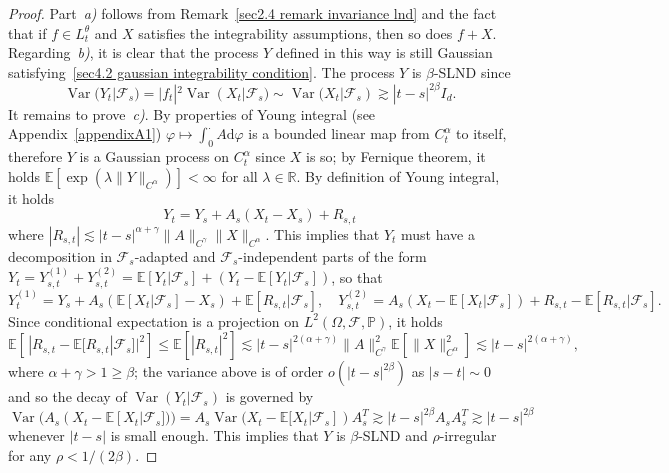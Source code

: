 \documentclass[10pt]{article}
\newcommand{\mathd}{\mathrm{d}}
\newcommand{\nobracket}{}
\newcommand{\tmop}[1]{\ensuremath{\operatorname{#1}}}
\newcommand{\tmtextit}[1]{{\itshape{#1}}}
\begin{document}
\begin{proof}
  Part~\tmtextit{a)} follows from Remark~\ref{sec2.4 remark invariance lnd}
  and the fact that if $f \in L^{\theta}_t$ and $X$ satisfies the
  integrability assumptions, then so does $f + X$. Regarding~\tmtextit{b)}, it
  is clear that the process $Y$ defined in this way is still Gaussian
  satisfying~\eqref{sec4.2 gaussian integrability condition}. The process $Y$
  is $\beta$-SLND since
  \[ \tmop{Var} (Y_t | \mathcal{F}_s \nobracket) = | f_t |^2 \tmop{Var} (X_t |
     \mathcal{F}_s \nobracket) \sim \tmop{Var} (X_t | \mathcal{F}_s
     \nobracket) \gtrsim | t - s |^{2 \beta} I_d . \]
  It remains to prove~\tmtextit{c)}. By properties of Young integral (see
  Appendix~\ref{appendixA1}) $\varphi \mapsto \int_0^{\cdot} A \mathd \varphi$
  is a bounded linear map from $C^{\alpha}_t$ to itself, therefore $Y$ is a
  Gaussian process on $C^{\alpha}_t$ since $X$ is so; by Fernique theorem, it
  holds $\mathbb{E} [\exp (\lambda \| Y \|_{C^{\alpha}})] < \infty$ for all
  $\lambda \in \mathbb{R}$. By definition of Young integral, it holds
  \[ Y_t = Y_s + A_s (X_t - X_s) + R_{s, t} \]
  where $| R_{s, t} | \lesssim | t - s |^{\alpha + \gamma} \| A
  \|_{C^{\gamma}} \| X \|_{C^{\alpha}}$. This implies that $Y_t$ must have a
  decomposition in $\mathcal{F}_s$\mbox{-}adapted and
  $\mathcal{F}_s$\mbox{-}independent parts of the form $Y_t = Y_{s, t}^{(1)} +
  Y_{s, t}^{(2)} =\mathbb{E} [Y_t | \mathcal{F}_s] + (Y_t -\mathbb{E} [Y_t |
  \mathcal{F}_s])$, so that
  \[ Y^{(1)}_t = Y_s + A_s (\mathbb{E} [X_t | \mathcal{F}_s] - X_s)
     +\mathbb{E} [R_{s, t} | \mathcal{F}_s], \quad Y^{(2)}_{s, t} = A_s (X_t
     -\mathbb{E} [X_t | \mathcal{F}_s]) + R_{s, t} -\mathbb{E} [R_{s, t} |
     \mathcal{F}_s] . \]
  Since conditional expectation is a projection on $L^2 (\Omega, \mathcal{F},
  \mathbb{P})$, it holds
  \[ \mathbb{E} \left[ \, | R_{s, t} -\mathbb{E} [R_{s, t} | \mathcal{F}_s]
     |^2 \right] \leqslant \mathbb{E} [| R_{s, t} |^2] \lesssim | t - s |^{2
     (\alpha + \gamma)}  \| A \|_{C^{\gamma}}^2 \mathbb{E} [\| X
     \|^2_{C^{\alpha}}] \lesssim | t - s |^{2 (\alpha + \gamma)}, \]
  where $\alpha + \gamma > 1 \geqslant \beta$; the variance above is of order
  $o (| t - s |^{2 \beta})$ as $| s - t | \sim 0$ and so the decay of
  $\tmop{Var} (Y_t | \mathcal{F}_s \nobracket)$ is governed by
  \[ \tmop{Var} (A_s  (X_t -\mathbb{E} [X_t | \mathcal{F}_s])) = A_s
     \tmop{Var} (X_t -\mathbb{E} [X_t | \mathcal{F}_s]) A^T_s \gtrsim | t - s
     |^{2 \beta} A_s A_s^T \gtrsim | t - s |^{2 \beta} \]
  whenever $| t - s |$ is small enough. This implies that $Y$ is
  $\beta$\mbox{-}SLND and $\rho$-irregular for any $\rho < 1 / (2 \beta)$.
\end{proof}
\end{document}
